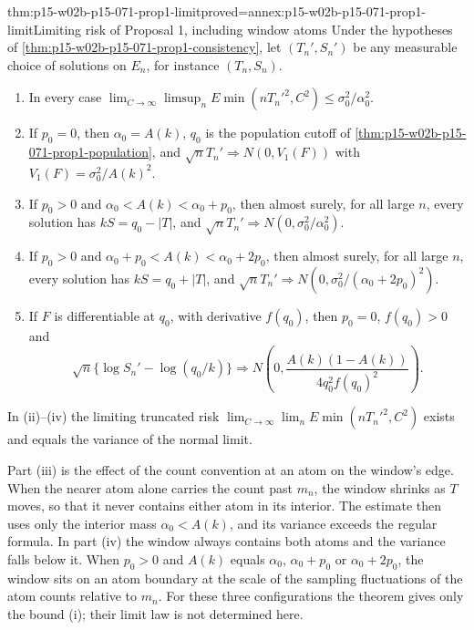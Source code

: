 \begin{hbtheorem}{thm:p15-w02b-p15-071-prop1-limit}{proved=annex:p15-w02b-p15-071-prop1-limit}{Limiting risk of Proposal 1, including window atoms}
Under the hypotheses of \cref{thm:p15-w02b-p15-071-prop1-consistency},
let \((T_n',S_n')\) be any measurable choice of solutions on \(E_n\),
for instance \((T_n,S_n)\).
\begin{enumerate}
\item In every case
 \(\lim_{C\to\infty}\limsup_nE\min(nT_n'^2,C^2)\leq\sigma_0^2/\alpha_0^2\).
\item If \(p_0=0\), then \(\alpha_0=A(k)\), \(q_0\) is the population
 cutoff of \cref{thm:p15-w02b-p15-071-prop1-population}, and
 \(\sqrt nT_n'\Rightarrow N(0,V_1(F))\) with
 \(V_1(F)=\sigma_0^2/A(k)^2\).
\item If \(p_0>0\) and \(\alpha_0<A(k)<\alpha_0+p_0\), then almost
 surely, for all large \(n\), every solution has \(kS=q_0-|T|\), and
 \(\sqrt nT_n'\Rightarrow N(0,\sigma_0^2/\alpha_0^2)\).
\item If \(p_0>0\) and \(\alpha_0+p_0<A(k)<\alpha_0+2p_0\), then almost
 surely, for all large \(n\), every solution has \(kS=q_0+|T|\), and
 \(\sqrt nT_n'\Rightarrow N(0,\sigma_0^2/(\alpha_0+2p_0)^2)\).
\item If \(F\) is differentiable at \(q_0\), with derivative
 \(f(q_0)\), then \(p_0=0\), \(f(q_0)>0\) and
 \[
  \sqrt n\{\log S_n'-\log(q_0/k)\}\Longrightarrow
  N\!\left(0,\frac{A(k)(1-A(k))}{4q_0^2f(q_0)^2}\right).
 \]
\end{enumerate}
In (ii)--(iv) the limiting truncated risk
\(\lim_{C\to\infty}\lim_nE\min(nT_n'^2,C^2)\) exists and equals the
variance of the normal limit.
\end{hbtheorem}

Part (iii) is the effect of the count convention at an atom on the
window's edge. When the nearer atom alone carries the count past
\(m_n\), the window shrinks as \(T\) moves, so that it never contains
either atom in its interior. The estimate then uses only the
interior mass \(\alpha_0<A(k)\), and its variance exceeds the regular
formula. In part (iv) the window always contains both atoms and the
variance falls below it. When \(p_0>0\) and \(A(k)\) equals
\(\alpha_0\), \(\alpha_0+p_0\) or \(\alpha_0+2p_0\), the window sits on
an atom boundary at the scale of the sampling fluctuations of the atom
counts relative to \(m_n\). For these three configurations the theorem
gives only the bound (i); their limit law is not determined here.

